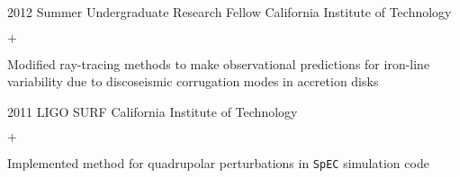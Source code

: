 \documentclass[]{luger-cv} %
\begin{document}
\begin{entrylist}
\ifdefined \onepage \else
\entry
{2012}
{Summer Undergraduate Research Fellow}
{California Institute of Technology}
{%
\vspace{-1em}
\begin{list}{$+$}{\cvlist}
\item Modified ray-tracing methods to make observational predictions for iron-line variability due to discoseismic corrugation modes in accretion disks
\end{list}
}


\ifdefined \onepage \else
\entry
{2011}
{LIGO SURF}
{California Institute of Technology}
{%
\vspace{-1em}
\begin{list}{$+$}{\cvlist}
\item Implemented method for quadrupolar perturbations in \texttt{SpEC} simulation code
\end{list}
}
\fi


\end{entrylist}

\end{document}
